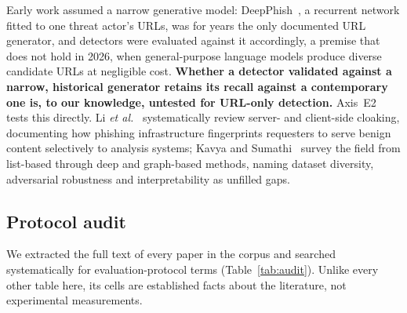 \documentclass[conference]{IEEEtran}
\begin{document}
Early work assumed a narrow generative model:
DeepPhish~\cite{bahnsen2018deepphish}, a recurrent network fitted to one
threat actor's URLs, was for years the only documented URL generator, and
detectors were evaluated against it accordingly, a premise that does not
hold in 2026, when general-purpose language models produce diverse
candidate URLs at negligible cost. \textbf{Whether a detector validated
against a narrow, historical generator retains its recall against a
contemporary one is, to our knowledge, untested for URL-only detection.}
Axis~E2 tests this directly. Li \emph{et al.}~\cite{li2023cloak}
systematically review server- and client-side cloaking, documenting how
phishing infrastructure fingerprints requesters to serve benign content
selectively to analysis systems; Kavya and
Sumathi~\cite{kavya2025review} survey the field from list-based through
deep and graph-based methods, naming dataset diversity, adversarial
robustness and interpretability as unfilled gaps.

\subsection{Protocol audit}

We extracted the full text of every paper in the corpus and searched
systematically for evaluation-protocol terms (Table~\ref{tab:audit}).
Unlike every other table here, its cells are established facts about the
literature, not experimental measurements.
\end{document}
